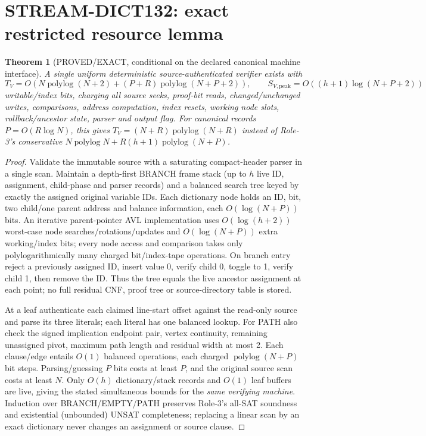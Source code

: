 \documentclass[11pt]{article}
\newtheorem{theorem}{Theorem}
\begin{document}
\section{STREAM-DICT132: exact restricted resource lemma}
\begin{theorem}[PROVED/EXACT, conditional on the declared canonical machine interface]
A single uniform deterministic source-authenticated verifier exists with
\[
T_V=O\left(N\operatorname{polylog}(N+2)+(P+R)\operatorname{polylog}(N+P+2)\right),\qquad
S_{V,\mathrm{peak}}=O\left((h+1)\log(N+P+2)\right)
\]
writable/index bits, charging all source seeks, proof-bit reads, changed/unchanged writes, comparisons, address computation, index resets, working node slots, rollback/ancestor state, parser and output flag. For canonical records \(P=O(R\log N)\), this gives \(T_V=(N+R)\operatorname{polylog}(N+R)\) instead of Role-3's conservative \(N\operatorname{polylog}N+R(h+1)\operatorname{polylog}(N+P)\).
\end{theorem}
\begin{proof}
Validate the immutable source with a saturating compact-header parser in a single scan. Maintain a depth-first BRANCH frame stack (up to \(h\) live ID, assignment, child-phase and parser records) and a balanced search tree keyed by exactly the assigned original variable IDs. Each dictionary node holds an ID, bit, two child/one parent address and balance information, each \(O(\log(N+P))\) bits. An iterative parent-pointer AVL implementation uses \(O(\log(h+2))\) worst-case node searches/rotations/updates and \(O(\log(N+P))\) extra working/index bits; every node access and comparison takes only polylogarithmically many charged bit/index-tape operations. On branch entry reject a previously assigned ID, insert value 0, verify child 0, toggle to 1, verify child 1, then remove the ID. Thus the tree equals the live ancestor assignment at each point; no full residual CNF, proof tree or source-directory table is stored.

At a leaf authenticate each claimed line-start offset against the read-only source and parse its three literals; each literal has one balanced lookup. For PATH also check the signed implication endpoint pair, vertex continuity, remaining unassigned pivot, maximum path length and residual width at most 2. Each clause/edge entails \(O(1)\) balanced operations, each charged \(\operatorname{polylog}(N+P)\) bit steps. Parsing/guessing \(P\) bits costs at least \(P\), and the original source scan costs at least \(N\). Only \(O(h)\) dictionary/stack records and \(O(1)\) leaf buffers are live, giving the stated simultaneous bounds for the \emph{same verifying machine}. Induction over BRANCH/EMPTY/PATH preserves Role-3's all-SAT soundness and existential (unbounded) UNSAT completeness; replacing a linear scan by an exact dictionary never changes an assignment or source clause.
\end{proof}
\end{document}
